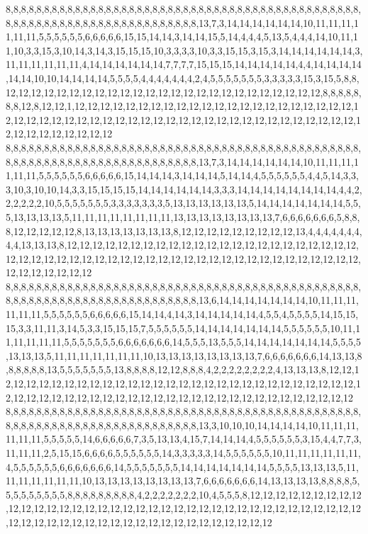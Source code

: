 8,8,8,8,8,8,8,8,8,8,8,8,8,8,8,8,8,8,8,8,8,8,8,8,8,8,8,8,8,8,8,8,8,8,8,8,8,8,8,8,8,8,8,8,8,8,8,8,8,8,8,8,8,8,8,8,8,8,8,8,8,8,8,8,8,8,8,8,8,8,8,13,7,3,14,14,14,14,14,14,10,11,11,11,11,11,11,5,5,5,5,5,5,6,6,6,6,6,15,15,14,14,3,14,14,15,5,14,4,4,4,5,13,5,4,4,4,14,10,11,11,10,3,3,15,3,10,14,3,14,3,15,15,15,10,3,3,3,3,10,3,3,15,15,3,15,3,14,14,14,14,14,14,3,11,11,11,11,11,11,4,14,14,14,14,14,14,7,7,7,7,15,15,15,14,14,14,14,14,4,4,14,14,14,14,14,14,10,10,14,14,14,14,5,5,5,5,4,4,4,4,4,4,4,2,4,5,5,5,5,5,5,5,3,3,3,3,3,15,3,15,5,8,8,12,12,12,12,12,12,12,12,12,12,12,12,12,12,12,12,12,12,12,12,12,12,12,12,12,8,8,8,8,8,8,8,12,8,12,12,1,12,12,12,12,12,12,12,12,12,12,12,12,12,12,12,12,12,12,12,12,12,12,12,12,12,12,12,12,12,12,12,12,12,12,12,12,12,12,12,12,12,12,12,12,12,12,12,12,12,12,12,12,12,12,12,12,12,12,12
8,8,8,8,8,8,8,8,8,8,8,8,8,8,8,8,8,8,8,8,8,8,8,8,8,8,8,8,8,8,8,8,8,8,8,8,8,8,8,8,8,8,8,8,8,8,8,8,8,8,8,8,8,8,8,8,8,8,8,8,8,8,8,8,8,8,8,8,8,8,8,13,7,3,14,14,14,14,14,14,10,11,11,11,11,11,11,5,5,5,5,5,5,6,6,6,6,6,15,14,14,14,3,14,14,14,5,14,14,4,5,5,5,5,5,5,4,4,5,14,3,3,3,10,3,10,10,14,3,3,15,15,15,15,14,14,14,14,14,14,3,3,3,14,14,14,14,14,14,14,14,4,4,2,2,2,2,2,2,10,5,5,5,5,5,5,5,3,3,3,3,3,3,3,5,13,13,13,13,13,13,5,14,14,14,14,14,14,14,5,5,5,13,13,13,13,5,11,11,11,11,11,11,11,11,13,13,13,13,13,13,13,13,7,6,6,6,6,6,6,6,5,8,8,8,12,12,12,12,12,8,13,13,13,13,13,13,13,8,12,12,12,12,12,12,12,12,12,13,4,4,4,4,4,4,4,4,4,13,13,13,8,12,12,12,12,12,12,12,12,12,12,12,12,12,12,12,12,12,12,12,12,12,12,12,12,12,12,12,12,12,12,12,12,12,12,12,12,12,12,12,12,12,12,12,12,12,12,12,12,12,12,12,12,12,12,12,12,12,12
8,8,8,8,8,8,8,8,8,8,8,8,8,8,8,8,8,8,8,8,8,8,8,8,8,8,8,8,8,8,8,8,8,8,8,8,8,8,8,8,8,8,8,8,8,8,8,8,8,8,8,8,8,8,8,8,8,8,8,8,8,8,8,8,8,8,8,8,8,8,8,13,6,14,14,14,14,14,14,14,10,11,11,11,11,11,11,5,5,5,5,5,5,6,6,6,6,6,15,14,14,4,14,3,14,14,14,14,14,4,5,5,4,5,5,5,5,14,15,15,15,3,3,11,11,3,14,5,3,3,15,15,15,7,5,5,5,5,5,5,14,14,14,14,14,14,14,5,5,5,5,5,5,10,11,11,11,11,11,11,5,5,5,5,5,5,5,6,6,6,6,6,6,6,14,5,5,5,13,5,5,5,14,14,14,14,14,14,14,5,5,5,5,13,13,13,5,11,11,11,11,11,11,11,10,13,13,13,13,13,13,13,13,7,6,6,6,6,6,6,6,14,13,13,8,8,8,8,8,8,13,5,5,5,5,5,5,5,13,8,8,8,8,12,12,8,8,8,4,2,2,2,2,2,2,2,2,4,13,13,13,8,12,12,12,12,12,12,12,12,12,12,12,12,12,12,12,12,12,12,12,12,12,12,12,12,12,12,12,12,12,12,12,12,12,12,12,12,12,12,12,12,12,12,12,12,12,12,12,12,12,12,12,12,12,12,12,12,12,12
8,8,8,8,8,8,8,8,8,8,8,8,8,8,8,8,8,8,8,8,8,8,8,8,8,8,8,8,8,8,8,8,8,8,8,8,8,8,8,8,8,8,8,8,8,8,8,8,8,8,8,8,8,8,8,8,8,8,8,8,8,8,8,8,8,8,8,8,8,8,8,13,3,10,10,10,14,14,14,14,10,11,11,11,11,11,11,5,5,5,5,5,14,6,6,6,6,6,7,3,5,13,13,4,15,7,14,14,14,4,5,5,5,5,5,5,3,15,4,4,7,7,3,11,11,11,2,5,15,15,6,6,6,6,5,5,5,5,5,5,14,3,3,3,3,3,14,5,5,5,5,5,5,10,11,11,11,11,11,11,4,5,5,5,5,5,5,6,6,6,6,6,6,6,14,5,5,5,5,5,5,5,14,14,14,14,14,14,14,5,5,5,5,13,13,13,5,11,11,11,11,11,11,11,10,13,13,13,13,13,13,13,13,7,6,6,6,6,6,6,6,14,13,13,13,13,8,8,8,8,5,5,5,5,5,5,5,5,5,8,8,8,8,8,8,8,8,8,4,2,2,2,2,2,2,2,10,4,5,5,5,8,12,12,12,12,12,12,12,12,12,12,12,12,12,12,12,12,12,12,12,12,12,12,12,12,12,12,12,12,12,12,12,12,12,12,12,12,12,12,12,12,12,12,12,12,12,12,12,12,12,12,12,12,12,12,12,12,12,12
